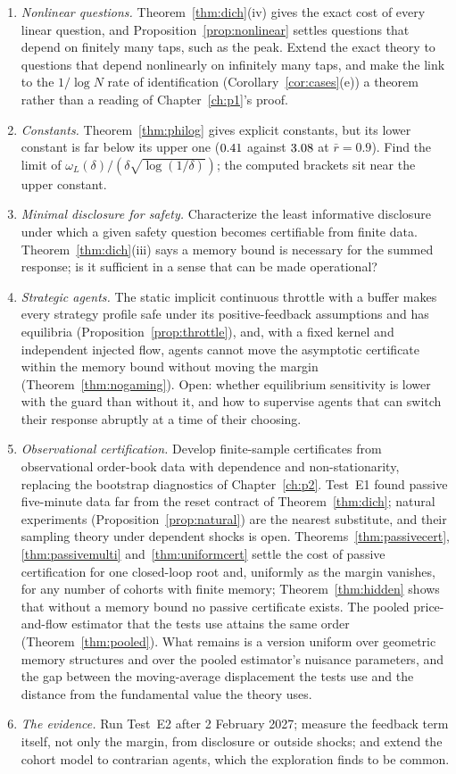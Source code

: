 \begin{enumerate}
\item \emph{Nonlinear questions.} Theorem~\ref{thm:dich}(iv) gives the exact cost of every linear question, and Proposition~\ref{prop:nonlinear} settles questions that depend on finitely many taps, such as the peak. Extend the exact theory to questions that depend nonlinearly on infinitely many taps, and make the link to the $1/\log N$ rate of identification (Corollary~\ref{cor:cases}(e)) a theorem rather than a reading of Chapter~\ref{ch:p1}'s proof.
\item \emph{Constants.} Theorem~\ref{thm:philog} gives explicit constants, but its lower constant is far below its upper one ($0.41$ against $3.08$ at $\bar r=0.9$). Find the limit of $\omega_L(\delta)/(\delta\sqrt{\log(1/\delta)})$; the computed brackets sit near the upper constant.
\item \emph{Minimal disclosure for safety.} Characterize the least informative disclosure under which a given safety question becomes certifiable from finite data. Theorem~\ref{thm:dich}(iii) says a memory bound is necessary for the summed response; is it sufficient in a sense that can be made operational?
\item \emph{Strategic agents.} The static implicit continuous throttle with a buffer makes every strategy profile safe under its positive-feedback assumptions and has equilibria (Proposition~\ref{prop:throttle}), and, with a fixed kernel and independent injected flow, agents cannot move the asymptotic certificate within the memory bound without moving the margin (Theorem~\ref{thm:nogaming}). Open: whether equilibrium sensitivity is lower with the guard than without it, and how to supervise agents that can switch their response abruptly at a time of their choosing.
\item \emph{Observational certification.} Develop finite-sample certificates from observational order-book data with dependence and non-stationarity, replacing the bootstrap diagnostics of Chapter~\ref{ch:p2}. Test~E1 found passive five-minute data far from the reset contract of Theorem~\ref{thm:dich}; natural experiments (Proposition~\ref{prop:natural}) are the nearest substitute, and their sampling theory under dependent shocks is open. Theorems~\ref{thm:passivecert}, \ref{thm:passivemulti} and~\ref{thm:uniformcert} settle the cost of passive certification for one closed-loop root and, uniformly as the margin vanishes, for any number of cohorts with finite memory; Theorem~\ref{thm:hidden} shows that without a memory bound no passive certificate exists. The pooled price-and-flow estimator that the tests use attains the same order (Theorem~\ref{thm:pooled}). What remains is a version uniform over geometric memory structures and over the pooled estimator's nuisance parameters, and the gap between the moving-average displacement the tests use and the distance from the fundamental value the theory uses.
\item \emph{The evidence.} Run Test~E2 after 2 February 2027; measure the feedback term itself, not only the margin, from disclosure or outside shocks; and extend the cohort model to contrarian agents, which the exploration finds to be common.
\end{enumerate}
